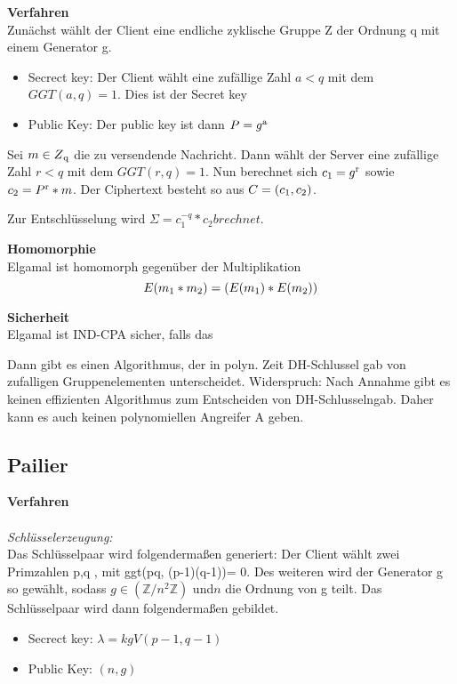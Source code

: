 \textbf{Verfahren}\\

Zunächst wählt der Client eine endliche zyklische Gruppe Z der Ordnung q mit einem Generator g.
\begin{itemize}	
	\item Secrect key: Der Client wählt eine zufällige Zahl $a<q$ mit dem $GGT(a,q) = 1$. Dies ist der Secret key
	\item Public Key: Der public key ist dann $P = g\textsuperscript{a} $	
\end{itemize}

Sei $m \in Z\textsubscript{q}$ die zu versendende Nachricht. Dann wählt der Server eine zufällige Zahl $r<q$ mit dem $GGT(r,q) = 1$. Nun berechnet sich $c\textsubscript{1} = g\textsuperscript{r}$ sowie $c\textsubscript{2} =P \textsuperscript{r} *m$. Der Ciphertext besteht so aus $C = (c\textsubscript{1},c\textsubscript{2})$.

Zur Entschlüsselung wird $\Sigma = c_{1}^{-q} * c_{2} brechnet.$

\textbf{Homomorphie}\\
Elgamal ist homomorph gegenüber der Multiplikation
$$ E(m \textsubscript{1} * m \textsubscript{2}) = (E(m \textsubscript{1}) * E(m \textsubscript{2}))$$

\textbf{Sicherheit}\\
Elgamal ist IND-CPA sicher, falls das



Dann gibt es einen Algorithmus, der in polyn. Zeit DH-Schlussel gab von zufalligen Gruppenelementen unterscheidet.
Widerspruch:
Nach Annahme gibt es keinen effizienten
Algorithmus zum Entscheiden von DH-Schlusselngab.
Daher kann es auch keinen polynomiellen Angreifer A geben.



\subsection{Pailier}
\label{sec:Sec1.3.2}

\textbf{Verfahren}\\
\\
\textit{Schlüsselerzeugung:}\\
Das Schlüsselpaar wird folgendermaßen generiert:
Der Client wählt zwei Primzahlen p,q , mit ggt(pq, (p-1)(q-1))= 0. Des weiteren wird der Generator g so gewählt, sodass $ g \in (\mathbb{Z}/ n^{2} \mathbb{Z}) $ und$ n $ die Ordnung von g teilt.
Das Schlüsselpaar wird dann folgendermaßen gebildet.
\begin{itemize}	
	\item Secrect key: $ \lambda = kgV(p-1, q-1) $
	\item Public Key: $(n,g)$	
\end{itemize}

